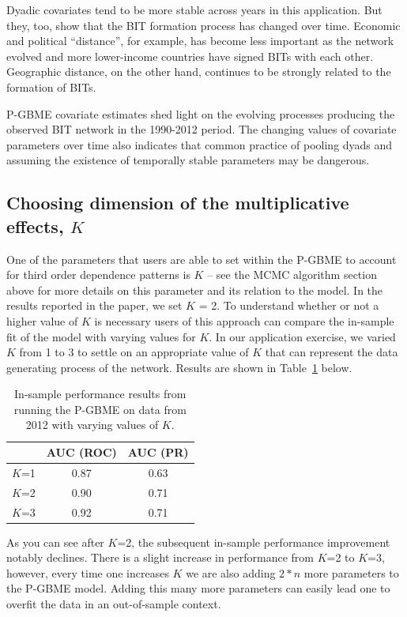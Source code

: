 \documentclass[a4paper, 12pt]{article}
\begin{document}
Dyadic covariates tend to be more stable across years in this application.  But they, too, show that the BIT formation process has changed over time.  Economic and political ``distance'', for example, has become less important as the network evolved and more lower-income countries have signed BITs with each other.  Geographic distance, on the other hand, continues to be strongly related to the formation of BITs.

P-GBME covariate estimates shed light on the evolving processes producing the observed BIT network in the 1990-2012 period.  The changing values of covariate parameters over time also indicates that common practice of pooling dyads and assuming the existence of temporally stable parameters may be dangerous.

\subsection{Choosing dimension of the multiplicative effects, $K$}

One of the parameters that users are able to set within the P-GBME to account for third order dependence patterns is $K$ -- see the MCMC algorithm section above for more details on this parameter and its relation to the model. In the results reported in the paper, we set $K$ = 2. To understand whether or not a higher value of $K$ is necessary users of this approach can compare the in-sample fit of the model with varying values for $K$. In our application exercise, we varied $K$ from 1 to 3 to settle on an appropriate value of $K$ that can represent the data generating process of the network. Results are shown in Table~\ref{tab:kvar} below.

\begin{table}[ht]
\centering
\caption{In-sample performance results from running the P-GBME on data from 2012 with varying values of $K$.}
\label{tab:kvar}
\begin{tabular}{lcc}
\toprule
~ & AUC (ROC) & AUC (PR) \\
\midrule
  $K$=1 & 0.87 & 0.63 \\
  $K$=2 & 0.90 & 0.71 \\
  $K$=3 & 0.92 & 0.71 \\ 
\bottomrule
\end{tabular}
\end{table}

As you can see after $K$=2, the subsequent in-sample performance improvement notably declines. There is a slight increase in performance from $K$=2 to $K$=3, however, every time one increases $K$ we are also adding $2*n$ more parameters to the P-GBME model. Adding this many more parameters can easily lead one to overfit the data in an out-of-sample context. 

\singlespacing
\clearpage


\end{document}
